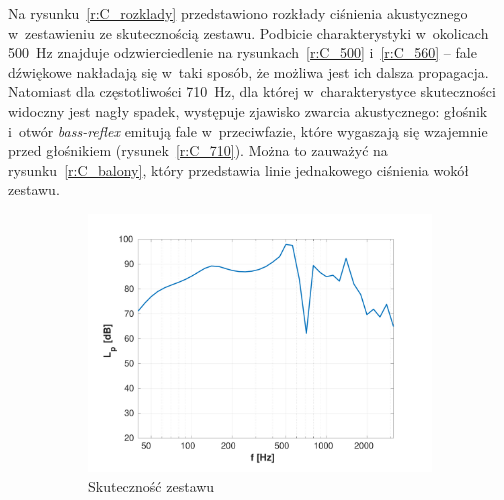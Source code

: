 \documentclass[12pt]{oska}
\begin{document}
	Na rysunku~\ref{r:C_rozklady} przedstawiono rozkłady ciśnienia akustycznego w~zestawieniu ze skutecznością zestawu. Podbicie charakterystyki w~okolicach \SI{500}{\hertz} znajduje odzwierciedlenie na rysunkach~\ref{r:C_500} i~\ref{r:C_560} -- fale dźwiękowe nakładają się w~taki sposób, że możliwa jest ich dalsza propagacja. Natomiast dla częstotliwości \SI{710}{\hertz}, dla której w~charakterystyce skuteczności widoczny jest nagły spadek, występuje zjawisko zwarcia akustycznego: głośnik i~otwór \textit{bass-reflex} emitują fale w~przeciwfazie, które wygaszają się wzajemnie przed głośnikiem (rysunek~\ref{r:C_710}). Można to zauważyć na rysunku~\ref{r:C_balony}, który przedstawia linie jednakowego ciśnienia wokół zestawu.
	
	\begin{figure}[!ht]
		\centering
		\begin{subfigure}[b]{.49\textwidth}
			\includegraphics[width=\textwidth,trim={1.25cm .5cm 2cm 1cm},clip]{skutecznosc_comsol.pdf}
			\caption{Skuteczność zestawu}
			\label{r:C_skutecznosc}
		\end{subfigure}
		~
		\begin{subfigure}[b]{.49\textwidth}

\end{subfigure}
\end{figure}
\end{document}
